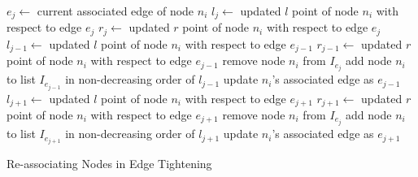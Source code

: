 \documentclass{llncs}
\begin{document}
\begin{algorithm}[h!]%
	\begin{spacing}{1}
	\begin{algorithmic}[1]
				\State $e_j \leftarrow$ current associated edge of node $n_i$
				\State $l_j \leftarrow$ updated $l$ point of node $n_i$ with respect to edge $e_j$
				\State $r_j \leftarrow$ updated $r$ point of node $n_i$ with respect to edge $e_j$
				  
					\State $l_{j-1} \leftarrow$ updated $l$ point of node $n_i$ with respect to edge $e_{j-1}$
				    \State $r_{j-1} \leftarrow$ updated $r$ point of node $n_i$ with respect to edge $e_{j-1}$
						\State remove node $n_i$ from  $I_{e_{j}}$
						\State add node $n_i$ to list $I_{e_{j-1}}$ in non-decreasing order of $l_{j-1}$
						\State update $n_i$'s associated edge as $e_{j-1}$
					\EndIf
				\EndIf
				  
					\State $l_{j+1} \leftarrow$ updated $l$ point of node $n_i$ with respect to edge $e_{j+1}$
					\State $r_{j+1} \leftarrow$ updated $r$ point of node $n_i$ with respect to edge $e_{j+1}$
						\State remove node $n_i$ from  $I_{e_{j}}$
						\State add node $n_i$ to list $I_{e_{j+1}}$ in non-decreasing order of $l_{j+1}$
						\State update $n_i$'s associated edge as $e_{j+1}$
					\EndIf
				\EndIf
			\EndFor 
	\end{algorithmic}
	\end{spacing}
	\caption{Re-associating Nodes in Edge Tightening}
	\label{algo:re_associating_circles}
\end{algorithm}
\end{document}
